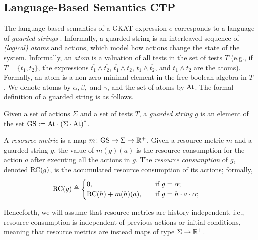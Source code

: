 \subsection{Language-Based Semantics CTP}
The language-based semantics of a GKAT expression $e$ corresponds to a language of \emph{guarded strings} \cite{GKAT}. Informally, a guarded string is an interleaved sequence of \emph{(logical) atoms} and actions, which model how actions change the state of the system. Informally, an \emph{atom} is a valuation of all tests in the set of tests $T$ (e.g., if $T=\{t_1,t_2\}$, the expressions  $\overline{t_1}\land \overline{t_2}$, $\overline{t_1}\land {t_2}$, $t_1\land \overline{t_2}$, and $t_1\land {t_2}$ are the atoms). Formally, an atom is a non-zero minimal element in the free boolean algebra in $T$ \cite{KAT}. We denote atoms by $\alpha, \beta,$ and $\gamma$, and the set of atoms by $\text{At}$. The formal definition of a guarded string is as follows.

\begin{definition}
Given a set of actions $\Sigma$ and a set of tests $T$, a \emph{guarded string} $g$ is an element of the set $\text{GS} := \text{At} \cdot \left(\Sigma\cdot \text{At}\right)^{*}$. 
\end{definition}

\begin{definition}
A \emph{resource metric} is a map $m\colon \text{GS} \rightarrow \Sigma \rightarrow \mathbb{R}^{+}$. Given a resource metric $m$ and a guarded string $g$, the value of $m(g)(a)$ is the {resource consumption for the action $a$ after executing all the actions in $g$}. The \emph{resource consumption} of $g$, denoted $\text{RC}(g)$, is the accumulated resource consumption of its actions; formally,
\begin{align}
\text{RC}(g)&\triangleq 
\begin{cases}
0, &\quad \text{if $g=\alpha$;}\\
\text{RC}(h) + m(h)(a),&\quad \text{if $g=h \cdot a\cdot \alpha $;}\\
\end{cases}
\end{align}

Henceforth, we will assume that resource metrics are history-independent, i.e., resource consumption is independent of previous actions or initial conditions, meaning that resource metrics are instead maps of type $\Sigma \rightarrow \mathbb{R}^{+}$.  

\end{definition}

